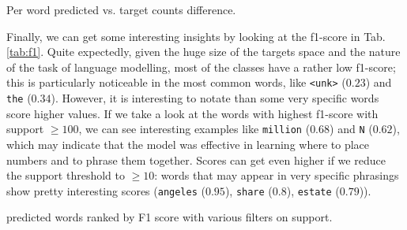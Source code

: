 \begin{table}[hbt]
    \centering
    
    \caption{Per word predicted vs. target counts difference.}
    \label{tab:diff_counts}
\end{table}

Finally, we can get some interesting insights by looking at the f1-score in Tab.\ref{tab:f1}. Quite expectedly, given the huge size of the targets space and the nature of the task of language modelling, most of the classes have a rather low f1-score; this is particularly noticeable in the most common words, like \texttt{<unk>} ($0.23$) and \texttt{the} ($0.34$). However, it is interesting to notate than some very specific words score higher values. If we take a look at the words with highest f1-score with support $\ge 100$, we can see interesting examples like \texttt{million} ($0.68$) and \texttt{N} ($0.62$), which may indicate that the model was effective in learning where to place numbers and to phrase them together. Scores can get even higher if we reduce the support threshold to $\ge 10$: words that may appear in very specific phrasings show pretty interesting scores (\texttt{angeles} ($0.95$), \texttt{share} ($0.8$), \texttt{estate} ($0.79$)).

\begin{table}[hbt]
    \centering
    
    \caption{predicted words ranked by F1 score with various filters on support.}
    \label{tab:f1}
\end{table}
